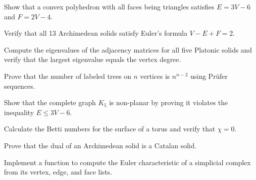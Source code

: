 \begin{exercise}
Show that a convex polyhedron with all faces being triangles satisfies $E = 3V - 6$ and $F = 2V - 4$.
\end{exercise}

\begin{exercise}
Verify that all 13 Archimedean solids satisfy Euler's formula $V - E + F = 2$.
\end{exercise}

\begin{exercise}[Computational]
Compute the eigenvalues of the adjacency matrices for all five Platonic solids and verify that the largest eigenvalue equals the vertex degree.
\end{exercise}

\begin{exercise}
Prove that the number of labeled trees on $n$ vertices is $n^{n-2}$ using Pr\"{u}fer sequences.
\end{exercise}

\begin{exercise}
Show that the complete graph $K_5$ is non-planar by proving it violates the inequality $E \leq 3V - 6$.
\end{exercise}

\begin{exercise}
Calculate the Betti numbers for the surface of a torus and verify that $\chi = 0$.
\end{exercise}

\begin{exercise}
Prove that the dual of an Archimedean solid is a Catalan solid.
\end{exercise}

\begin{exercise}[Computational]
Implement a function to compute the Euler characteristic of a simplicial complex from its vertex, edge, and face lists.
\end{exercise}
